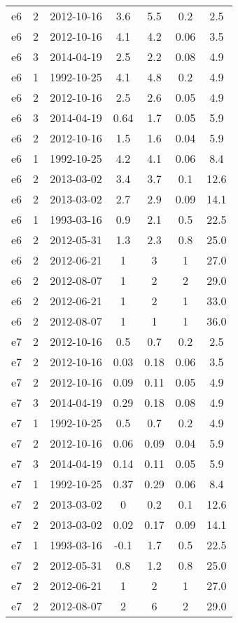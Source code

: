 \begin{longtable}{ccccccc}
e6 & 2 & 2012-10-16 & 3.6 & 5.5 & 0.2 & 2.5 \\
e6 & 2 & 2012-10-16 & 4.1 & 4.2 & 0.06 & 3.5 \\
e6 & 3 & 2014-04-19 & 2.5 & 2.2 & 0.08 & 4.9 \\
e6 & 1 & 1992-10-25 & 4.1 & 4.8 & 0.2 & 4.9 \\
e6 & 2 & 2012-10-16 & 2.5 & 2.6 & 0.05 & 4.9 \\
e6 & 3 & 2014-04-19 & 0.64 & 1.7 & 0.05 & 5.9 \\
e6 & 2 & 2012-10-16 & 1.5 & 1.6 & 0.04 & 5.9 \\
e6 & 1 & 1992-10-25 & 4.2 & 4.1 & 0.06 & 8.4 \\
e6 & 2 & 2013-03-02 & 3.4 & 3.7 & 0.1 & 12.6 \\
e6 & 2 & 2013-03-02 & 2.7 & 2.9 & 0.09 & 14.1 \\
e6 & 1 & 1993-03-16 & 0.9 & 2.1 & 0.5 & 22.5 \\
e6 & 2 & 2012-05-31 & 1.3 & 2.3 & 0.8 & 25.0 \\
e6 & 2 & 2012-06-21 & 1 & 3 & 1 & 27.0 \\
e6 & 2 & 2012-08-07 & 1 & 2 & 2 & 29.0 \\
e6 & 2 & 2012-06-21 & 1 & 2 & 1 & 33.0 \\
e6 & 2 & 2012-08-07 & 1 & 1 & 1 & 36.0 \\
e7 & 2 & 2012-10-16 & 0.5 & 0.7 & 0.2 & 2.5 \\
e7 & 2 & 2012-10-16 & 0.03 & 0.18 & 0.06 & 3.5 \\
e7 & 2 & 2012-10-16 & 0.09 & 0.11 & 0.05 & 4.9 \\
e7 & 3 & 2014-04-19 & 0.29 & 0.18 & 0.08 & 4.9 \\
e7 & 1 & 1992-10-25 & 0.5 & 0.7 & 0.2 & 4.9 \\
e7 & 2 & 2012-10-16 & 0.06 & 0.09 & 0.04 & 5.9 \\
e7 & 3 & 2014-04-19 & 0.14 & 0.11 & 0.05 & 5.9 \\
e7 & 1 & 1992-10-25 & 0.37 & 0.29 & 0.06 & 8.4 \\
e7 & 2 & 2013-03-02 & 0 & 0.2 & 0.1 & 12.6 \\
e7 & 2 & 2013-03-02 & 0.02 & 0.17 & 0.09 & 14.1 \\
e7 & 1 & 1993-03-16 & -0.1 & 1.7 & 0.5 & 22.5 \\
e7 & 2 & 2012-05-31 & 0.8 & 1.2 & 0.8 & 25.0 \\
e7 & 2 & 2012-06-21 & 1 & 2 & 1 & 27.0 \\
e7 & 2 & 2012-08-07 & 2 & 6 & 2 & 29.0 \\

\end{longtable}
